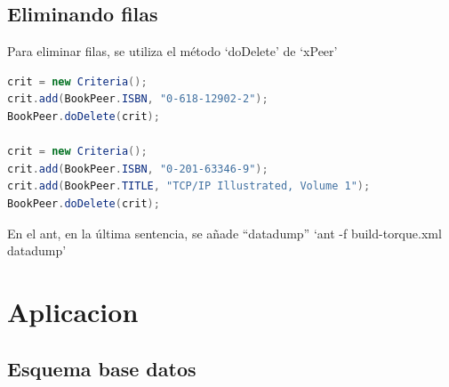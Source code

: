 \documentclass[12pt, oneside]{article}
\begin{document}
\subsection{Eliminando filas}

Para eliminar filas, se utiliza el método ‘doDelete’ de ‘xPeer’

\begin{lstlisting}[language=Java]
crit = new Criteria();
crit.add(BookPeer.ISBN, "0-618-12902-2");
BookPeer.doDelete(crit);

crit = new Criteria();
crit.add(BookPeer.ISBN, "0-201-63346-9");
crit.add(BookPeer.TITLE, "TCP/IP Illustrated, Volume 1");
BookPeer.doDelete(crit);
\end{lstlisting}

En el ant, en la última sentencia, se añade “datadump” 
‘ant -f build-torque.xml datadump’

\section{Aplicacion}
\subsection{Esquema base datos}

\end{document}
